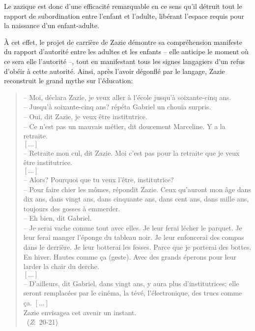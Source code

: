Le  zazique est donc d'une efficacité remarquable en ce sens qu'il détruit tout le rapport de subordination entre l'enfant et l'adulte, libérant l'espace requis pour la naissance d'un enfant-adulte.
\par
À cet effet, le projet de carrière de Zazie démontre sa compréhension manifeste du rapport d'autorité entre les adultes et les enfants -- elle anticipe le moment où ce sera elle l'autorité --, tout en manifestant tous les signes langagiers d'un refus d'obéir à cette autorité.
Ainsi, après l'avoir dégonflé par le langage, Zazie reconstruit le grand mythe sur l'éducation:
\begin{quote}
  \begin{singlespace}
    \small
    -- Moi, déclara Zazie, je veux aller à l'école jusqu'à soixante-cinq ans. \\
    -- Jusqu'à soixante-cinq ans? répéta Gabriel un chouïa surpris. \\
    -- Oui, dit Zazie, je veux être institutrice. \\
    -- Ce n'est pas un mauvais métier, dit doucement Marceline. Y a la retraite. \\
    $\left[ \dots \right]$\\
    -- Retraite mon cul, dit Zazie. Moi c'est pas pour la retraite que je veux être institutrice. \\
    $\left[ \dots \right]$ \\
    -- Alors? Pourquoi que tu veux l'être, institutrice? \\
    -- Pour faire chier les mômes, répondit Zazie. Ceux qu'auront mon âge dans dix ans, dans vingt ans, dans cinquante ans, dans cent ans, dans mille ans, toujours des gosses à emmerder. \\
    -- Eh bien, dit Gabriel. \\
    -- Je serai vache comme tout avec elles. Je leur ferai lécher le parquet. Je leur ferai manger l'éponge du tableau noir. Je leur enfoncerai des compas dans le derrière. Je leur botterai les fesses. Parce que je porterai des bottes. En hiver. Hautes comme ça (geste). Avec des grands éperons pour leur larder la chair du derche. \\
    $\left[ \dots \right]$ \\
    -- D'ailleurs, dit Gabriel, dans vingt ans, y aura plus d'institutrices: elle seront remplacées par le cinéma, la tévé, l'électronique, des trucs comme ça. $\left[ \dots \right]$ \\
    Zazie envisagea cet avenir un instant. \\
    ~(\textit{Z}:~20-21)
    \normalsize
  \end{singlespace}
\end{quote}
